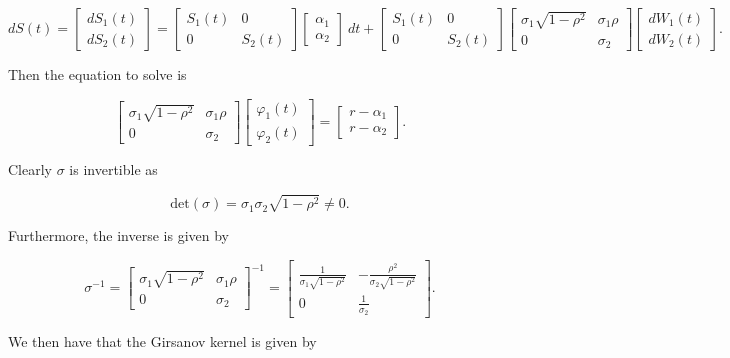 \documentclass[
]{book}
\begin{document}
\[
dS(t)=
\begin{bmatrix}
dS_1(t)\\
dS_2(t)
\end{bmatrix}
=
\begin{bmatrix}
S_1(t) &0 \\
0& S_2(t)
\end{bmatrix}
\begin{bmatrix}
\alpha_1\\
\alpha_2
\end{bmatrix}
\ dt+
\begin{bmatrix}
S_1(t) &0 \\
0& S_2(t)
\end{bmatrix}
\begin{bmatrix}
\sigma_1\sqrt{1-\rho^2} & \sigma_1\rho\\
0&\sigma_2
\end{bmatrix}
\begin{bmatrix}
dW_1(t)\\
dW_2(t)
\end{bmatrix}.
\]

Then the equation to solve is

\[
\begin{bmatrix}
\sigma_1\sqrt{1-\rho^2} & \sigma_1\rho\\
0&\sigma_2
\end{bmatrix}
\begin{bmatrix}
\varphi_1(t)\\
\varphi_2(t)
\end{bmatrix}=
\begin{bmatrix}
r-\alpha_1\\
r-\alpha_2
\end{bmatrix}.
\]

Clearly \(\sigma\) is invertible as

\[
\text{det}(\sigma)=\sigma_1\sigma_2\sqrt{1-\rho^2}\ne 0.
\]

Furthermore, the inverse is given by

\[
\sigma^{-1}=\begin{bmatrix}
\sigma_1\sqrt{1-\rho^2} & \sigma_1\rho\\
0&\sigma_2
\end{bmatrix}^{-1}=
\begin{bmatrix}
\frac{1}{\sigma_1\sqrt{1-\rho^2}} & -\frac{\rho^2}{\sigma_2\sqrt{1-\rho^2}}\\
0 & \frac{1}{\sigma_2}
\end{bmatrix}.
\]

We then have that the Girsanov kernel is given by
\end{document}
